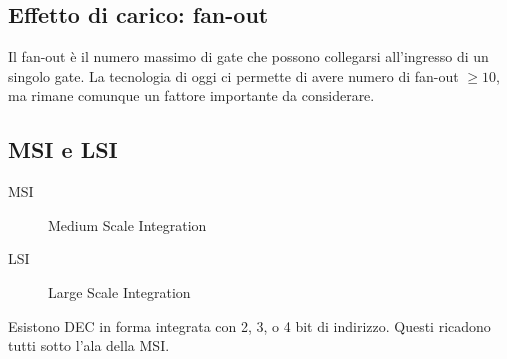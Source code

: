 \documentclass{article}
\begin{document}
\subsection{Effetto di carico: fan-out}

Il fan-out è il numero massimo di gate che possono collegarsi all'ingresso di un singolo gate.
La tecnologia di oggi ci permette di avere numero di fan-out $\geq 10$, ma rimane comunque un fattore importante da considerare.

\subsection{MSI e LSI}

\begin{description}
    \item[MSI] Medium Scale Integration
    \item[LSI] Large Scale Integration
\end{description}

\noindent
Esistono DEC in forma integrata con 2, 3, o 4 bit di indirizzo.
Questi ricadono tutti sotto l'ala della MSI.
\end{document}
